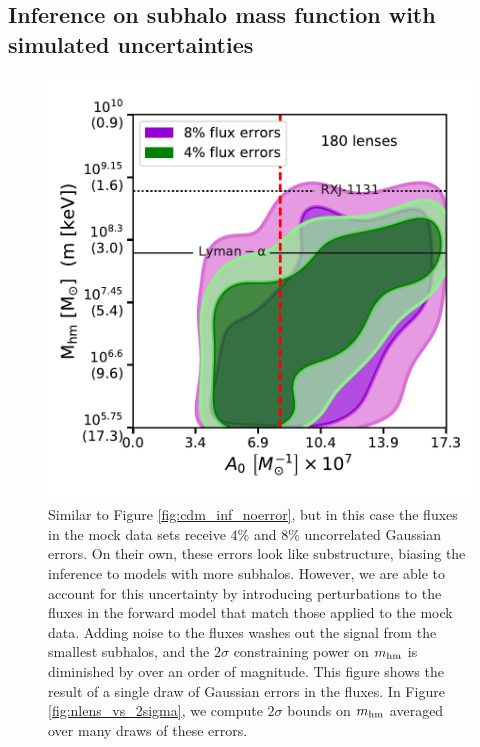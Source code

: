 \subsection{Inference on subhalo mass function with simulated uncertainties}
\label{ssec:real_inf}

\begin{figure}
	\centering
	\includegraphics[clip,trim=0cm .5cm .3cm
	.5cm,width=.75\textwidth,keepaspectratio]{./figures_ABCforward/joint_180_4_8_errors.pdf}
	\caption[Posterior distribution inferred from CDM mock datasets with measurement errors]{\label{fig:cdm_inf_error} Similar to Figure \ref{fig:cdm_inf_noerror}, but in this case the fluxes in the mock data sets receive $4\%$ and $8\%$ uncorrelated Gaussian errors. On their own, these errors look like substructure, biasing the inference to models with more subhalos. However, we are able to account for this uncertainty by introducing perturbations to the fluxes in the forward model that match those applied to the mock data. Adding noise to the fluxes washes out the signal from the smallest subhalos, and the $2\sigma$ constraining power on $m_{\rm{hm}}$ is diminished by over an order of magnitude. This figure shows the result of a single draw of Gaussian errors in the fluxes. In Figure \ref{fig:nlens_vs_2sigma}, we compute $2\sigma$ bounds on $m_{\rm{hm}}$ averaged over many draws of these errors.}
\end{figure}

